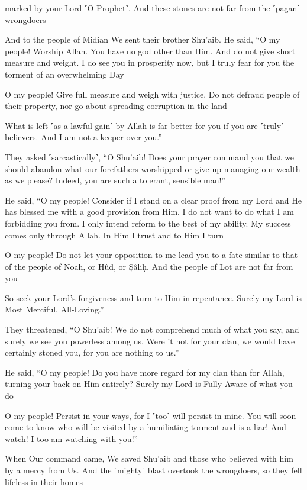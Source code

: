 marked by your Lord ˹O Prophet˺. And these stones are not far from the ˹pagan˺ wrongdoers

And to the people of Midian We sent their brother Shu’aib. He said, “O my people! Worship Allah. You have no god other than Him. And do not give short measure and weight. I do see you in prosperity now, but I truly fear for you the torment of an overwhelming Day

O my people! Give full measure and weigh with justice. Do not defraud people of their property, nor go about spreading corruption in the land

What is left ˹as a lawful gain˺ by Allah is far better for you if you are ˹truly˺ believers. And I am not a keeper over you.”

They asked ˹sarcastically˺, “O Shu’aib! Does your prayer command you that we should abandon what our forefathers worshipped or give up managing our wealth as we please? Indeed, you are such a tolerant, sensible man!”

He said, “O my people! Consider if I stand on a clear proof from my Lord and He has blessed me with a good provision from Him. I do not want to do what I am forbidding you from. I only intend reform to the best of my ability. My success comes only through Allah. In Him I trust and to Him I turn

O my people! Do not let your opposition to me lead you to a fate similar to that of the people of Noah, or Hûd, or Ṣâliḥ. And the people of Lot are not far from you

So seek your Lord’s forgiveness and turn to Him in repentance. Surely my Lord is Most Merciful, All-Loving.”

They threatened, “O Shu’aib! We do not comprehend much of what you say, and surely we see you powerless among us. Were it not for your clan, we would have certainly stoned you, for you are nothing to us.”

He said, “O my people! Do you have more regard for my clan than for Allah, turning your back on Him entirely? Surely my Lord is Fully Aware of what you do

O my people! Persist in your ways, for I ˹too˺ will persist in mine. You will soon come to know who will be visited by a humiliating torment and is a liar! And watch! I too am watching with you!”

When Our command came, We saved Shu’aib and those who believed with him by a mercy from Us. And the ˹mighty˺ blast overtook the wrongdoers, so they fell lifeless in their homes

